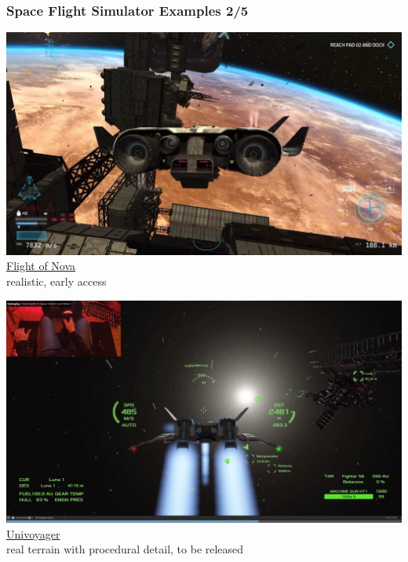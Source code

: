 \documentclass[aspectratio=169,11pt,xcolor=dvipsnames]{beamer}
\begin{document}
\begin{frame}
  \frametitle{Space Flight Simulator Examples 2/5}
  \begin{minipage}[t]{0.49\textwidth}
    \begin{center}
      \includegraphics[width=\textwidth]{flight-of-nova}\\
      \href{https://flight-of-nova.com/}{Flight of Nova}\\
      realistic, early access
    \end{center}
  \end{minipage}
  \begin{minipage}[t]{0.49\textwidth}
    \begin{center}
      \includegraphics[width=\textwidth]{univoyager}\\
      \href{https://www.univoyager.com/}{Univoyager}\\
      real terrain with procedural detail, to be released
    \end{center}
  \end{minipage}
\end{frame}
\end{document}
